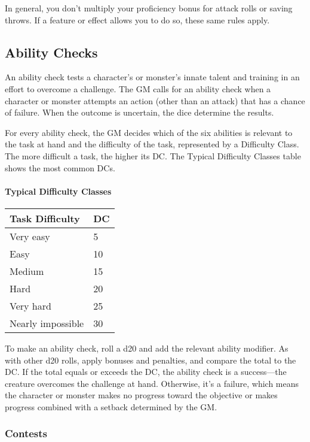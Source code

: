 \documentclass[
]{article}
\begin{document}
In general, you don't multiply your proficiency bonus for attack rolls
or saving throws. If a feature or effect allows you to do so, these same
rules apply.

\hypertarget{ability-checks}{%
\subsection{Ability Checks}\label{ability-checks}}

An ability check tests a character's or monster's innate talent and
training in an effort to overcome a challenge. The GM calls for an
ability check when a character or monster attempts an action (other than
an attack) that has a chance of failure. When the outcome is uncertain,
the dice determine the results.

For every ability check, the GM decides which of the six abilities is
relevant to the task at hand and the difficulty of the task, represented
by a Difficulty Class. The more difficult a task, the higher its DC. The
Typical Difficulty Classes table shows the most common DCs.

\hypertarget{typical-difficulty-classes}{%
\paragraph{Typical Difficulty
Classes}\label{typical-difficulty-classes}}

\begin{longtable}[]{@{}ll@{}}
\toprule
Task Difficulty & DC\tabularnewline
\midrule
\endhead
Very easy & 5\tabularnewline
Easy & 10\tabularnewline
Medium & 15\tabularnewline
Hard & 20\tabularnewline
Very hard & 25\tabularnewline
Nearly impossible & 30\tabularnewline
\bottomrule
\end{longtable}

To make an ability check, roll a d20 and add the relevant ability
modifier. As with other d20 rolls, apply bonuses and penalties, and
compare the total to the DC. If the total equals or exceeds the DC, the
ability check is a success---the creature overcomes the challenge at
hand. Otherwise, it's a failure, which means the character or monster
makes no progress toward the objective or makes progress combined with a
setback determined by the GM.

\hypertarget{contests}{%
\subsubsection{Contests}\label{contests}}
\end{document}

